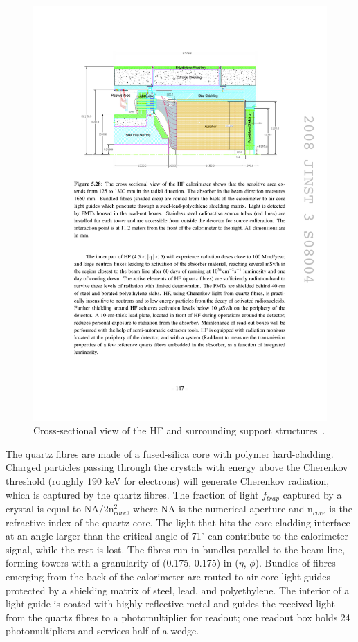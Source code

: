 \begin{figure}[hbtp]
  \begin{center}
    \includegraphics[width=1.5\cmsFigWidth]{figures/cms-hcal-HFxsec}
    \caption{Cross-sectional view of the HF and surrounding support structures~\cite{1748-0221-3-08-S08004}.}
    \label{fig:cms-hcal-HF}
  \end{center}
\end{figure}

The quartz fibres are made of a fused-silica core with polymer hard-cladding. Charged particles passing through the crystals with energy above the Cherenkov threshold (roughly 190 keV for electrons) will generate Cherenkov radiation, which is captured by the quartz fibres. The fraction of light $f_{trap}$ captured by a crystal is equal to NA/2n$_{core}^2$, where NA is the numerical aperture and n$_{core}$ is the refractive index of the quartz core. The light that hits the core-cladding interface at an angle larger than the critical angle of 71$^{\circ}$ can contribute to the calorimeter signal, while the rest is lost. The fibres run in bundles parallel to the beam line, forming towers with a granularity of (0.175, 0.175) in ($\eta$, $\phi$). Bundles of fibres emerging from the back of the calorimeter are routed to air-core light guides protected by a shielding matrix of steel, lead, and polyethylene. The interior of a light guide is coated with highly reflective metal and guides the received light from the quartz fibres to a photomultiplier for readout; one readout box holds 24 photomultipliers and services half of a wedge.

